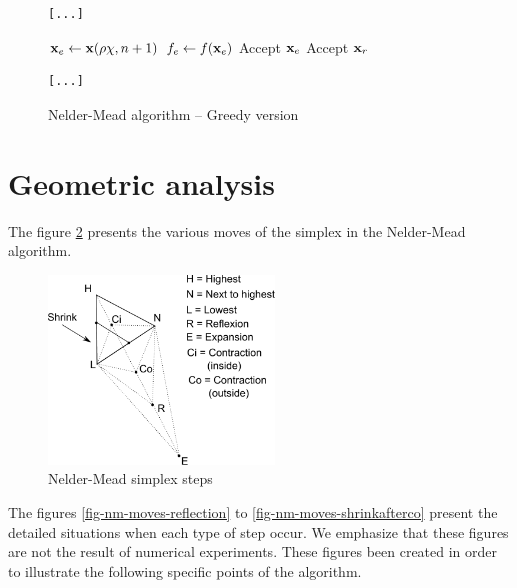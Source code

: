 \begin{figure}[htbp]
\begin{verbatim}
[...]
\end{verbatim}
\begin{algorithmic}
    \STATE $\mathbf{x}_e \gets \mathbf{x}(\rho\chi,n+1)$ 
    \STATE $f_e \gets f(\mathbf{x}_e)$ 
      \STATE Accept $\mathbf{x}_e$
    \ELSE
      \STATE Accept $\mathbf{x}_r$
    \ENDIF
\end{algorithmic}
\begin{verbatim}
[...]
\end{verbatim}
\caption{Nelder-Mead algorithm -- Greedy version}
\label{algo-neldermead-greedy}
\end{figure}


\section{Geometric analysis}

The figure \ref{fig-nm-moves} presents the various moves of the 
simplex in the Nelder-Mead algorithm.

\begin{figure}
\begin{center}
\includegraphics[width=6cm]{nelder-mead-steps.pdf}
\end{center}
\caption{Nelder-Mead simplex steps}
\label{fig-nm-moves}
\end{figure}

The figures \ref{fig-nm-moves-reflection} 
to \ref{fig-nm-moves-shrinkafterco} present the 
detailed situations when each type of step occur.
We emphasize that these figures are not the result of 
numerical experiments. These figures been created in order 
to illustrate the following specific points of the algorithm.

